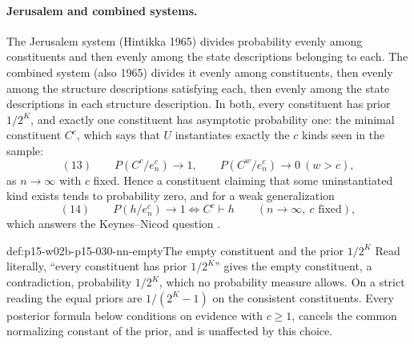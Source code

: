\paragraph{Jerusalem and combined systems.} The Jerusalem system
(Hintikka 1965) divides probability evenly among constituents and then
evenly among the state descriptions belonging to each. The combined
system (also 1965) divides it evenly among constituents, then evenly
among the structure descriptions satisfying each, then evenly among the
state descriptions in each structure description. In both, every
constituent has prior \(1/2^K\), and exactly one constituent has
asymptotic probability one: the minimal constituent \(C^c\), which says
that \(U\) instantiates exactly the \(c\) kinds seen in the sample:
\[
 (13)\qquad P(C^c/e^c_n)\to1,\qquad P(C^w/e^c_n)\to0\ (w>c),
\]
as \(n\to\infty\) with \(c\) fixed.
Hence a constituent claiming that some uninstantiated kind exists tends
to probability zero, and for a weak generalization
\[
 (14)\qquad P(h/e^c_n)\to1\iff C^c\vdash h\qquad(n\to\infty,\ c\text{ fixed}),
\]
which answers the Keynes--Nicod question
\cite[pp.~319--320]{Niiniluoto2011HintikkaProgramReading}.

\begin{hbwarning}{def:p15-w02b-p15-030-nn-empty}{The empty constituent and the prior \(1/2^K\)}
Read literally, ``every constituent has prior \(1/2^K\)'' gives the empty
constituent, a contradiction, probability \(1/2^K\), which no probability
measure allows. On a strict reading the equal priors are \(1/(2^K-1)\) on
the consistent constituents. Every posterior formula below conditions on
evidence with \(c\geq1\), cancels the common normalizing constant of the
prior, and is unaffected by this choice.
\end{hbwarning}

